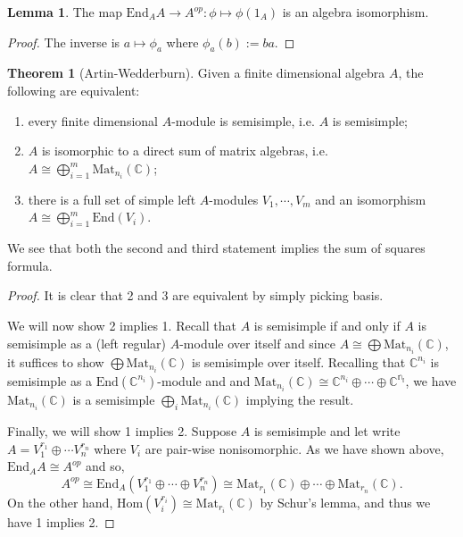 \documentclass[]{article}
\theoremstyle{definition}
\newtheorem{theorem}{Theorem}
\theoremstyle{definition}
\newtheorem{lemma}{Lemma}[section]
\begin{document}
\begin{lemma}
  The map \(\text{End}_A A \to A^{op} : \phi \mapsto \phi(1_A)\) is an algebra 
  isomorphism.
\end{lemma}
\begin{proof}
  The inverse is \(a \mapsto \phi_a\) where \(\phi_a(b) := ba\).
\end{proof}

\begin{theorem}[Artin-Wedderburn]
  Given a finite dimensional algebra \(A\), the following are equivalent:
  \begin{enumerate}
    \item every finite dimensional \(A\)-module is semisimple, i.e. 
      \(A\) is semisimple;
    \item \(A\) is isomorphic to a direct sum of matrix algebras, i.e.
      \(A \cong \bigoplus_{i = 1}^m \text{Mat}_{n_i}(\mathbb{C})\);
    \item there is a full set of simple left \(A\)-modules \(V_1, \cdots, V_m\) 
      and an isomorphism \(A \cong \bigoplus_{i = 1}^m \text{End}(V_i)\).
  \end{enumerate}
\end{theorem}

We see that both the second and third statement implies the sum of squares formula.

\begin{proof}
  It is clear that 2 and 3 are equivalent by simply picking basis. 
  
  We will now show 2 implies 1. 
  Recall that \(A\) is semisimple if and only if \(A\) is semisimple as a 
  (left regular) \(A\)-module over itself and since 
  \(A \cong \bigoplus \text{Mat}_{n_i}(\mathbb{C})\), it suffices to show 
  \(\bigoplus \text{Mat}_{n_i}(\mathbb{C})\) is semisimple over itself. 
  Recalling that \(\mathbb{C}^{n_i}\) is semisimple 
  as a \( \text{End}(\mathbb{C}^{n_i})\)-module and
  and \(\text{Mat}_{n_i}(\mathbb{C}) \cong \mathbb{C}^{n_i} \oplus \cdots \oplus 
  \mathbb{C^{n_i}}\), we have \(\text{Mat}_{n_i}(\mathbb{C})\) is a semisimple 
  \(\bigoplus_i \text{Mat}_{n_i}(\mathbb{C})\) implying the result.

  Finally, we will show 1 implies 2. Suppose \(A\) is semisimple and let 
  write \(A = V_1^{r_1} \oplus \cdots V_n^{r_n}\) where \(V_i\) are 
  pair-wise nonisomorphic. As we have shown above, \(\text{End}_A A \cong A^{op}\)
  and so, 
  \[A^{op} \cong \text{End}_A(V_1^{r_1} \oplus \cdots \oplus V_n^{r_n})
   \cong \text{Mat}_{r_1}(\mathbb{C}) \oplus \cdots \oplus 
   \text{Mat}_{r_n}(\mathbb{C}).\]
  On the other hand, \(\text{Hom}(V_i^{r_i}) \cong \text{Mat}_{r_i}(\mathbb{C})\) 
  by Schur's lemma, and thus we have 1 implies 2. 
\end{proof}
\end{document}
